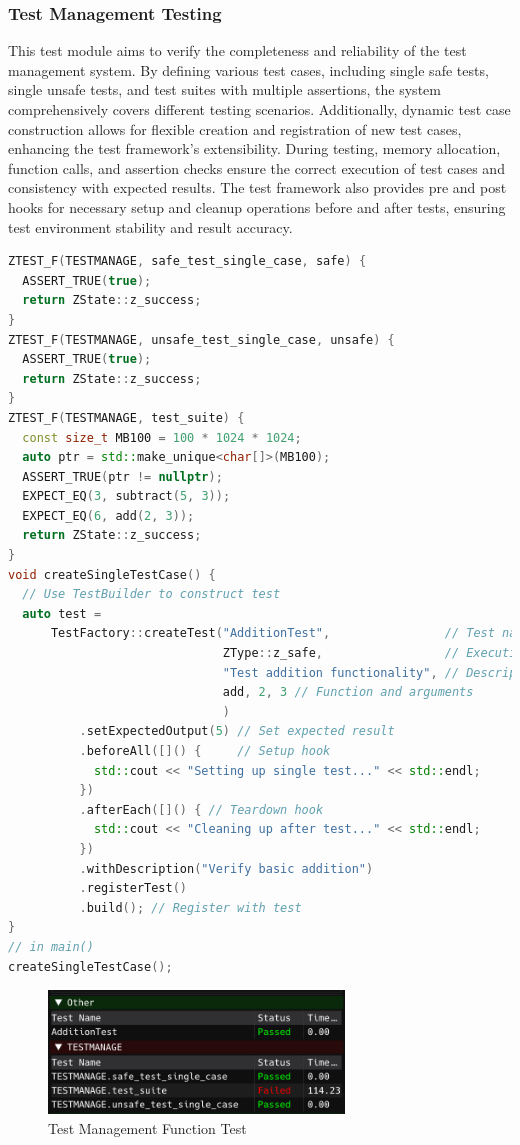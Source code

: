 \documentclass{article}
\begin{document}
\subsubsection{Test Management Testing}
This test module aims to verify the completeness and reliability of the test management system. By defining various test cases, including single safe tests, single unsafe tests, and test suites with multiple assertions, the system comprehensively covers different testing scenarios. Additionally, dynamic test case construction allows for flexible creation and registration of new test cases, enhancing the test framework's extensibility. During testing, memory allocation, function calls, and assertion checks ensure the correct execution of test cases and consistency with expected results. The test framework also provides pre and post hooks for necessary setup and cleanup operations before and after tests, ensuring test environment stability and result accuracy.
\begin{framed}
    \begin{lstlisting}[language=C++]
ZTEST_F(TESTMANAGE, safe_test_single_case, safe) {
  ASSERT_TRUE(true);
  return ZState::z_success;
}
ZTEST_F(TESTMANAGE, unsafe_test_single_case, unsafe) {
  ASSERT_TRUE(true);
  return ZState::z_success;
}
ZTEST_F(TESTMANAGE, test_suite) {
  const size_t MB100 = 100 * 1024 * 1024;
  auto ptr = std::make_unique<char[]>(MB100);
  ASSERT_TRUE(ptr != nullptr);
  EXPECT_EQ(3, subtract(5, 3));
  EXPECT_EQ(6, add(2, 3));
  return ZState::z_success;
}
void createSingleTestCase() {
  // Use TestBuilder to construct test
  auto test =
      TestFactory::createTest("AdditionTest",                // Test name
                              ZType::z_safe,                 // Execution
                              "Test addition functionality", // Description
                              add, 2, 3 // Function and arguments
                              )
          .setExpectedOutput(5) // Set expected result
          .beforeAll([]() {     // Setup hook
            std::cout << "Setting up single test..." << std::endl;
          })
          .afterEach([]() { // Teardown hook
            std::cout << "Cleaning up after test..." << std::endl;
          })
          .withDescription("Verify basic addition")
          .registerTest()
          .build(); // Register with test
}
// in main()
createSingleTestCase();

\end{lstlisting}
\end{framed}
\begin{figure}[H]
    \centering
    \includegraphics[width=0.7\textwidth]{img/manage.png} %
    \caption{Test Management Function Test}
    \label{fig:test management function test}
\end{figure}
\newpage
\end{document}
